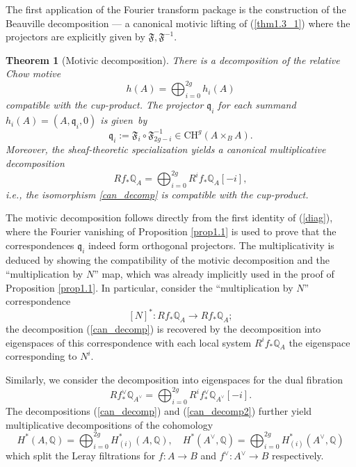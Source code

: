 \documentclass[11pt]{amsart}
\theoremstyle{plain}
\newtheorem{thm}{Theorem}[section]
\theoremstyle{definition}
\theoremstyle{remark}
\newcommand{\BQ}{{\mathbb{Q}}}
\begin{document}
The first application of the Fourier transform package is the construction of the Beauville decomposition --- a canonical motivic lifting of (\ref{thm1.3_1}) where the projectors are explicitly given by $\mathfrak{F}, \mathfrak{F}^{-1}$.

\begin{thm}[Motivic decomposition]\label{thm1.2}
    There is a decomposition of the relative Chow motive
    \[
    h(A) = \bigoplus_{i=0}^{2g} h_i(A)
    \]
    compatible with the cup-product. The projector $\mathfrak{q}_i$ for each summand $h_i(A)=(A, \mathfrak{q}_i, 0)$ is given~by 
    \[
    \mathfrak{q}_i:= \mathfrak{F}_i \circ \mathfrak{F}^{-1}_{2g-i} \in \mathrm{CH}^g(A \times_B A).
    \]
   Moreover, the sheaf-theoretic specialization yields a canonical multiplicative decomposition 
    \begin{equation}\label{can_decomp}
    Rf_*\BQ_A = \bigoplus_{i=0}^{2g} R^if_*\BQ_A[-i],
    \end{equation}
    \emph{i.e.}, the isomorphism \eqref{can_decomp} is compatible with the cup-product.
\end{thm}


The motivic decomposition follows directly from the first identity of (\ref{diag}), where the Fourier vanishing of Proposition \ref{prop1.1} is used to prove that the correspondences $\mathfrak{q}_i$ indeed form orthogonal projectors. The multiplicativity is deduced by showing the compatibility of the motivic decomposition and the ``multiplication by $N$'' map, which was already implicitly used in the proof of Proposition \ref{prop1.1}. In particular, consider the ``multiplication by $N$'' correspondence
\[
[N]^*: Rf_* \BQ_A \to Rf_*\BQ_A;
\]
the decomposition (\ref{can_decomp}) is recovered by the decomposition into eigenspaces of this correspondence with each local system $R^if_*\BQ_A$ the eigenspace corresponding to $N^i$. 


Similarly, we consider the decomposition into eigenspaces for the dual fibration
\begin{equation}\label{can_decomp2}
    Rf^\vee_*\BQ_{A^\vee} = \bigoplus_{i=0}^{2g} R^if^\vee_*\BQ_{A^\vee}[-i].
\end{equation}
The decompositions (\ref{can_decomp}) and (\ref{can_decomp2}) further yield multiplicative decompositions of the cohomology
\[
H^*(A,\BQ) = \bigoplus_{i=0}^{2g} H^*_{(i)}(A, \BQ), \quad H^*(A^\vee,\BQ) = \bigoplus_{i=0}^{2g} H^*_{(i)}(A^\vee, \BQ)
\]
which split the Leray filtrations for $f: A \to B$ and $f^\vee: A^\vee\to B$ respectively.
\end{document}
